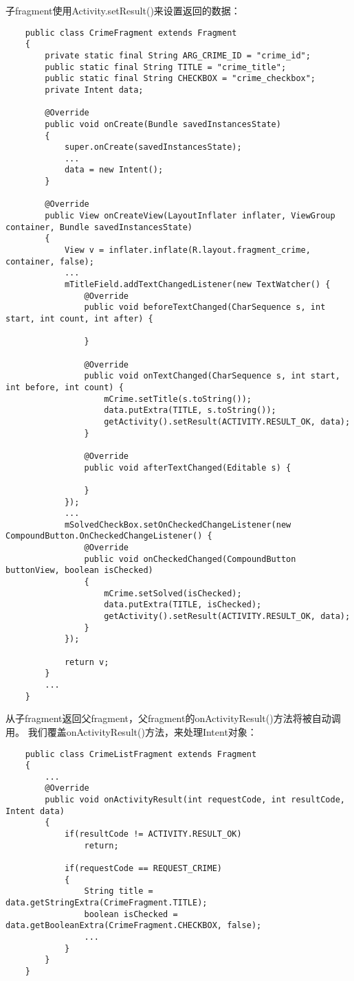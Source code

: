 \documentclass[a4paper,left=2.5cm,right=2.5cm,11pt]{article}
\begin{document}
	子fragment使用Activity.setResult()来设置返回的数据：
	\begin{lstlisting}
	public class CrimeFragment extends Fragment
	{
		private static final String ARG_CRIME_ID = "crime_id";
		public static final String TITLE = "crime_title";
		public static final String CHECKBOX = "crime_checkbox";
		private Intent data;

		@Override
		public void onCreate(Bundle savedInstancesState)
		{
			super.onCreate(savedInstancesState);
			...
			data = new Intent();
		}

		@Override
		public View onCreateView(LayoutInflater inflater, ViewGroup container, Bundle savedInstancesState)
		{
			View v = inflater.inflate(R.layout.fragment_crime, container, false);
			...
			mTitleField.addTextChangedListener(new TextWatcher() {
				@Override
				public void beforeTextChanged(CharSequence s, int start, int count, int after) {

				}

				@Override
				public void onTextChanged(CharSequence s, int start, int before, int count) {
					mCrime.setTitle(s.toString());
					data.putExtra(TITLE, s.toString());
					getActivity().setResult(ACTIVITY.RESULT_OK, data);
				}

				@Override
				public void afterTextChanged(Editable s) {

				}
			});
			...
			mSolvedCheckBox.setOnCheckedChangeListener(new CompoundButton.OnCheckedChangeListener() {
				@Override
				public void onCheckedChanged(CompoundButton buttonView, boolean isChecked)
				{
					mCrime.setSolved(isChecked);
					data.putExtra(TITLE, isChecked);
					getActivity().setResult(ACTIVITY.RESULT_OK, data);
				}
			});

			return v;
		}
		...
	}
	\end{lstlisting}

	从子fragment返回父fragment，父fragment的onActivityResult()方法将被自动调用。
	我们覆盖onActivityResult()方法，来处理Intent对象：
	\begin{lstlisting}
	public class CrimeListFragment extends Fragment
	{
		...
		@Override
		public void onActivityResult(int requestCode, int resultCode, Intent data)
		{
			if(resultCode != ACTIVITY.RESULT_OK)
				return;

			if(requestCode == REQUEST_CRIME)
			{
				String title = data.getStringExtra(CrimeFragment.TITLE);
				boolean isChecked = data.getBooleanExtra(CrimeFragment.CHECKBOX, false);
				...
			}
		}
	}
	\end{lstlisting}
\end{document}
